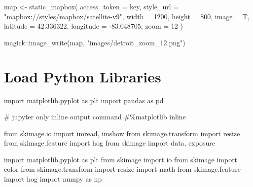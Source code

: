 \documentclass[
  letterpaper,
  DIV=11,
  numbers=noendperiod]{scrreprt}
\newenvironment{Shaded}{\begin{snugshade}}{\end{snugshade}}
\newcommand{\AttributeTok}[1]{\textcolor[rgb]{0.40,0.45,0.13}{#1}}
\newcommand{\CommentTok}[1]{\textcolor[rgb]{0.37,0.37,0.37}{#1}}
\newcommand{\DecValTok}[1]{\textcolor[rgb]{0.68,0.00,0.00}{#1}}
\newcommand{\FloatTok}[1]{\textcolor[rgb]{0.68,0.00,0.00}{#1}}
\newcommand{\FunctionTok}[1]{\textcolor[rgb]{0.28,0.35,0.67}{#1}}
\newcommand{\ImportTok}[1]{\textcolor[rgb]{0.00,0.46,0.62}{#1}}
\newcommand{\NormalTok}[1]{\textcolor[rgb]{0.00,0.23,0.31}{#1}}
\newcommand{\OtherTok}[1]{\textcolor[rgb]{0.00,0.23,0.31}{#1}}
\newcommand{\SpecialCharTok}[1]{\textcolor[rgb]{0.37,0.37,0.37}{#1}}
\newcommand{\StringTok}[1]{\textcolor[rgb]{0.13,0.47,0.30}{#1}}
\begin{document}
\begin{Shaded}
\begin{Highlighting}[]
\NormalTok{map }\OtherTok{\textless{}{-}} \FunctionTok{static\_mapbox}\NormalTok{(}
  \AttributeTok{access\_token =}\NormalTok{ key,}
  \AttributeTok{style\_url =} \StringTok{"mapbox://styles/mapbox/satellite{-}v9"}\NormalTok{,}
  \AttributeTok{width =} \DecValTok{1200}\NormalTok{,}
  \AttributeTok{height =} \DecValTok{800}\NormalTok{, }
  \AttributeTok{image =}\NormalTok{ T, }
  \AttributeTok{latitude =} \FloatTok{42.336322}\NormalTok{,}
  \AttributeTok{longitude =} \SpecialCharTok{{-}}\FloatTok{83.048705}\NormalTok{, }\AttributeTok{zoom =} \DecValTok{12}
\NormalTok{)}

\NormalTok{magick}\SpecialCharTok{::}\FunctionTok{image\_write}\NormalTok{(map, }\StringTok{"images/detroit\_zoom\_12.png"}\NormalTok{)}
\end{Highlighting}
\end{Shaded}

\hypertarget{load-python-libraries}{%
\section{Load Python Libraries}\label{load-python-libraries}}

\begin{Shaded}
\begin{Highlighting}[]

\ImportTok{import}\NormalTok{ matplotlib.pyplot }\ImportTok{as}\NormalTok{ plt}
\ImportTok{import}\NormalTok{ pandas }\ImportTok{as}\NormalTok{ pd}

\CommentTok{\# jupyter only inline output command}
\CommentTok{\#\%matplotlib inline}

\ImportTok{from}\NormalTok{ skimage.io }\ImportTok{import}\NormalTok{ imread, imshow}
\ImportTok{from}\NormalTok{ skimage.transform }\ImportTok{import}\NormalTok{ resize}
\ImportTok{from}\NormalTok{ skimage.feature }\ImportTok{import}\NormalTok{ hog}
\ImportTok{from}\NormalTok{ skimage }\ImportTok{import}\NormalTok{ data, exposure}


\ImportTok{import}\NormalTok{ matplotlib.pyplot }\ImportTok{as}\NormalTok{ plt}
\ImportTok{from}\NormalTok{ skimage }\ImportTok{import}\NormalTok{ io}
\ImportTok{from}\NormalTok{ skimage }\ImportTok{import}\NormalTok{ color}
\ImportTok{from}\NormalTok{ skimage.transform }\ImportTok{import}\NormalTok{ resize}
\ImportTok{import}\NormalTok{ math}
\ImportTok{from}\NormalTok{ skimage.feature }\ImportTok{import}\NormalTok{ hog}
\ImportTok{import}\NormalTok{ numpy }\ImportTok{as}\NormalTok{ np}
\end{Highlighting}
\end{Shaded}
\end{document}
